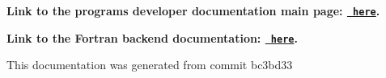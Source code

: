 \label{index_md_repo_PYTHON_MAINPAGE}%
%
 {\bfseries{Link to the program\textquotesingle{}s developer documentation main page\+: \href{https://joegilkes.github.io/PX915-Docs/}{\texttt{ here}}.}}

{\bfseries{Link to the Fortran backend documentation\+: \href{https://joegilkes.github.io/PX915-Docs/fortran/docs/index.html}{\texttt{ here}}.}}

This documentation was generated from commit bc3bd33 